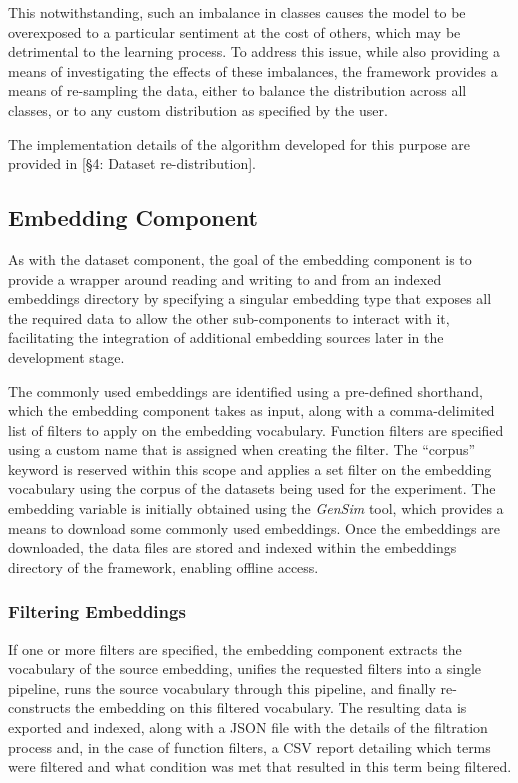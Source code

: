 \documentclass[12pt, a4paper]{report}
\theoremstyle{definition}
\theoremstyle{definition}%
\theoremstyle{definition}%
\theoremstyle{definition}%
\theoremstyle{definition}%
\theoremstyle{definition}%
\begin{document}
This notwithstanding, such an imbalance in classes causes the model to be overexposed to a particular sentiment at the cost of others, which may be detrimental to the learning process. To address this issue, while also providing a means of investigating the effects of these imbalances, the framework provides a means of re-sampling the data, either to balance the distribution across all classes, or to any custom distribution as specified by the user.

The implementation details of the algorithm developed for this purpose are provided in [\S4: Dataset re-distribution].

\subsection{Embedding Component}
As with the dataset component, the goal of the embedding component is to provide a wrapper around reading and writing to and from an indexed embeddings directory by specifying a singular embedding type that exposes all the required data to allow the other sub-components to interact with it, facilitating the integration of additional embedding sources later in the development stage. 

The commonly used embeddings are identified using a pre-defined shorthand, which the embedding component takes as input, along with a comma-delimited list of filters to apply on the embedding vocabulary. Function filters are specified using a custom name that is assigned when creating the filter. The \enquote{corpus} keyword is reserved within this scope and applies a set filter on the embedding vocabulary using the corpus of the datasets being used for the experiment. The embedding variable is initially obtained using the \textit{GenSim} tool, which provides a means to download some commonly used embeddings. Once the embeddings are downloaded, the data files are stored and indexed within the embeddings directory of the framework, enabling offline access.

\subsubsection{Filtering Embeddings}
If one or more filters are specified, the embedding component extracts the vocabulary of the source embedding, unifies the requested filters into a single pipeline, runs the source vocabulary through this pipeline, and finally re-constructs the embedding on this filtered vocabulary. The resulting data is exported and indexed, along with a JSON file with the details of the filtration process and, in the case of function filters, a CSV report detailing which terms were filtered and what condition was met that resulted in this term being filtered.
\end{document}
